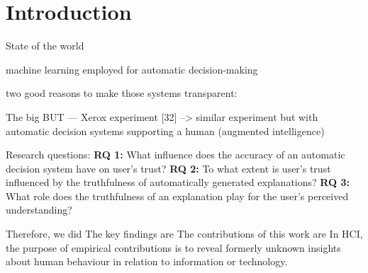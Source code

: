 \section{Introduction}

State of the world \newline

machine learning employed for automatic decision-making

two good reasons to make those systems transparent:



The big BUT\newline
--- Xerox experiment [32] \newline
--> similar experiment but with automatic decision systems supporting a human (augmented intelligence)
                           
Research questions:\newline
\textbf{RQ 1:} What influence does the accuracy of an automatic decision system have on user's trust?\newline
\textbf{RQ 2:} To what extent is user's trust influenced by the truthfulness of automatically generated explanations?\newline
\textbf{RQ 3:} What role does the truthfulness of an explanation play for the user's perceived understanding?\newline

Therefore, we did\newline
The key findings are\newline
The contributions of this work are\newline
In HCI, the purpose of empirical contributions is to reveal formerly unknown insights about human behaviour in relation to information or technology.



